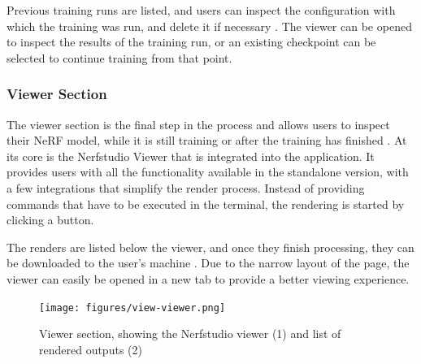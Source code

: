 Previous training runs are listed, and users can inspect the configuration with which the training was run, and delete it if necessary .
The viewer can be opened to inspect the results of the training run, or an existing checkpoint can be selected to continue training from that point.

\subsubsection*{Viewer Section}

The viewer section is the final step in the process and allows users to inspect their NeRF model, while it is still training or after the training has finished .
At its core is the Nerfstudio Viewer that is integrated into the application.
It provides users with all the functionality available in the standalone version, with a few integrations that simplify the render process.
Instead of providing commands that have to be executed in the terminal, the rendering is started by clicking a button.

The renders are listed below the viewer, and once they finish processing, they can be downloaded to the user's machine .
Due to the narrow layout of the page, the viewer can easily be opened in a new tab to provide a better viewing experience.

\begin{figure}[h!]
  \centering
  \texttt{[image: figures/view-viewer.png]}
  \caption{Viewer section, showing the Nerfstudio viewer (1) and list of rendered outputs (2)}
  \label{fig:design:viewer-section}
\end{figure}


